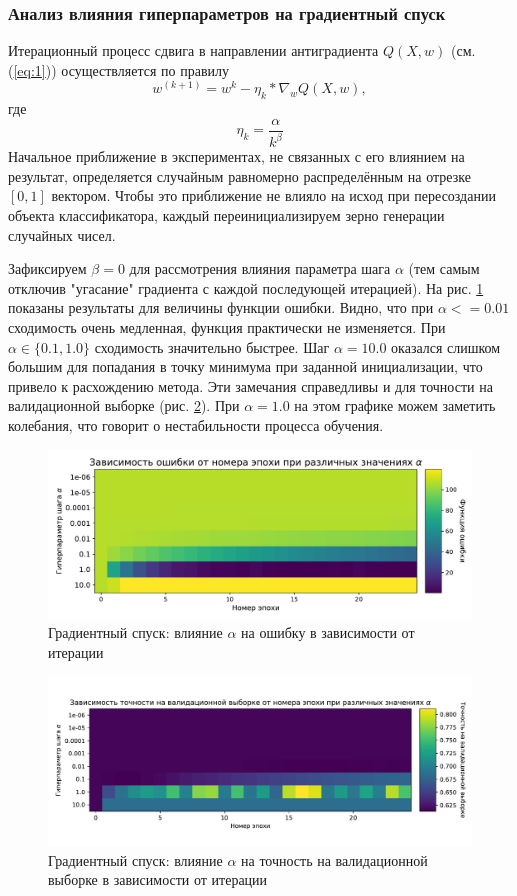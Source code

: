 \documentclass{article}
\begin{document}
            \subsubsection{Анализ влияния гиперпараметров на градиентный спуск}
                Итерационный процесс сдвига в направлении антиградиента $Q(X, w)$ (см. (\ref{eq:1})) осуществляется по правилу
                $$w^{(k+1)} = w^k - \eta_k * \nabla_wQ(X, w), $$ где
                $$\eta_k = \frac{\alpha}{k^{\beta}}$$
                Начальное приближение в экспериментах, не связанных с его влиянием на результат, определяется случайным равномерно распределённым на отрезке $[0, 1]$ вектором. Чтобы это приближение не влияло на исход при пересоздании объекта классификатора, каждый переинициализируем зерно генерации случайных чисел.

                Зафиксируем $\beta = 0$ для рассмотрения влияния параметра шага $\alpha$ (тем самым отключив "угасание" градиента с каждой последующей итерацией). На рис. \ref{fig:1} показаны результаты для величины функции ошибки. Видно, что при $\alpha <= 0.01$ сходимость очень медленная, функция практически не изменяется. При $\alpha \in \{0.1, 1.0\}$ сходимость значительно быстрее. Шаг $\alpha = 10.0$ оказался слишком большим для попадания в точку минимума при заданной инициализации, что привело к расхождению метода. Эти замечания справедливы и для точности на валидационной выборке (рис. \ref{fig:2}). При $\alpha = 1.0$ на этом графике можем заметить колебания, что говорит о нестабильности процесса обучения.
                \begin{figure}[H]
                    \centering
                    \includegraphics[width=0.8\linewidth]{./pictures/GDalphas_func.pdf}
                    \caption{Градиентный спуск: влияние $\alpha$ на ошибку в зависимости от итерации}
                    \label{fig:1}
                \end{figure}
                \begin{figure}[H]
                    \centering
                    \includegraphics[width=0.8\linewidth]{./pictures/GDalphas_val_accuracy.pdf}
                    \caption{Градиентный спуск: влияние $\alpha$ на точность на валидационной выборке в зависимости от итерации}
                    \label{fig:2}
                \end{figure}
\end{document}
